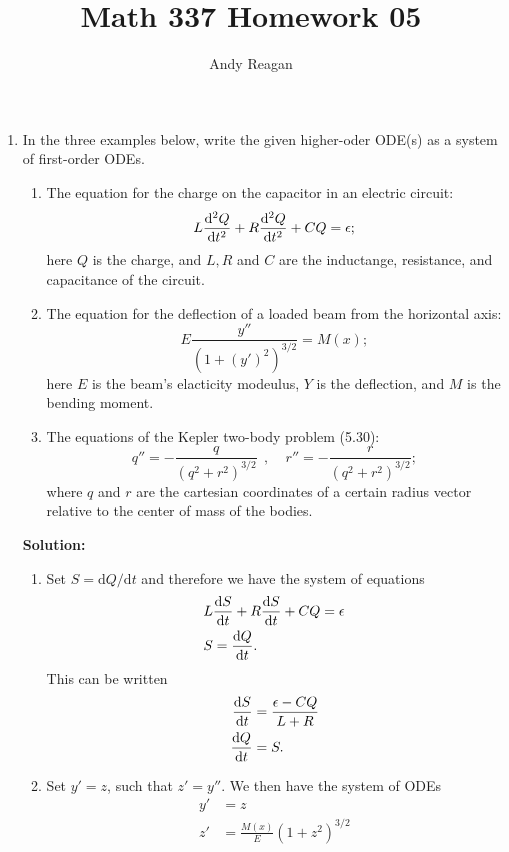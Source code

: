\documentclass[11pt]{article}
\author{Andy Reagan}
\title{Math 337 Homework 05}
\def\f{\frac }
\newcommand{\diff}[2]{\frac{{\rm d}#1}{{\rm d}#2}}
\newcommand{\diffsq}[2]{\frac{{\rm d}^{2}#1}{{\rm d} {#2}^2}}
\newcommand{\tdiff}[2]{\mbox{d} #1/\mbox{d} #2}
\begin{document}
\maketitle

\begin{enumerate}

\item In the three examples below, write the given higher-oder ODE(s) as a system of first-order ODEs.

\begin{enumerate}
\item The equation for the charge on the capacitor in an electric circuit:
\[ L \diffsq{Q}{t} + R \diffsq{Q}{t} + CQ = \epsilon ; \]
here $Q$ is the charge, and $L, R$ and $C$ are the inductange, resistance, and capacitance of the circuit.

\item The equation for the deflection of a loaded beam from the horizontal axis:
\[ E \f{y''}{(1+(y')^2)^{3/2}} = M(x) ; \]
here $E$ is the beam's elacticity modeulus, $Y$ is the deflection, and $M$ is the bending moment.

\item The equations of the Kepler two-body problem (5.30):
  \[ q'' = - \f{q}{(q^2+r^2)^{3/2}} ~~,~~~~~r'' = - \f{r}{(q^2+r^2)^{3/2}};  \]
where $q$ and $r$ are the cartesian coordinates of a certain radius vector relative to the center of mass of the bodies.

\end{enumerate}
\bigskip
\textbf{Solution:} 

\begin{enumerate}
\item Set $S = \tdiff{Q}{t}$ and therefore we have the system of equations
\begin{align} & L \diff{S}{t} + R \diff{S}{t} + CQ = \epsilon\\
& S = \diff{Q}{t} .\end{align}
This can be written
\begin{align} \diff{S}{t} &= \f{\epsilon - CQ}{L+R}\\
\diff{Q}{t} &= S.\end{align}

\item Set $y' = z$, such that $z' = y''$. We then have the system of ODEs
\begin{align*} y' &= z \\
z' &= \f{M(x)}{E} (1+z^2)^{3/2} \end{align*}


\end{enumerate}
\end{enumerate}
\end{document}
